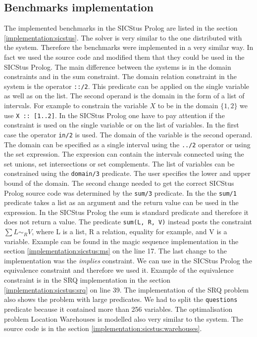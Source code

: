 \subsection{Benchmarks implementation}
The implemented benchmarks in the SICStus Prolog are listed in the section \ref{implementation:sicstus}.
The solver is very similar to the one distributed with the \eclipse system. Therefore
the benchmarks were implemented in a very similar way. In fact we used the \eclipse source
code and modified them that they could be used in the SICStus Prolog. The main difference
between the systems is in the domain constraints and in the sum constraint.
The domain relation constraint in the \eclipse system is the operator \texttt{::/2}.
This predicate can be applied on the single variable as well as on the list.
The second operand is the domain in the form of a list of intervals. For example to constrain
the variable $X$ to be in the domain $\{1,2\}$ we use \texttt{X :: [1..2]}. 
In the SICStus Prolog one have to pay attention if the constraint
is used on the single variable or on the list of variables. In the first case the operator
\texttt{in/2} is used. The domain of the variable is the second operand. The domain 
can be specified as a single interval using the \texttt{../2} operator or using the set
expression. The expresion can contain the intervals connected using the set unions, 
set intersections or set complements. The list of variables can be constrained using
the \texttt{domain/3} predicate. The user specifies the lower and upper bound of the 
domain. The second change needed to get the correct SICStus Prolog source code was
determined by the \texttt{sum/3} predicate. In the \eclipse the \texttt{sum/1} predicate
takes a list as an argument and the return value can be used in the expression. In the SICStus Prolog
the sum is standard predicate and therefore it does not return a value. The predicate 
\texttt{sum(L, R, V)} instead posts the constraint $\sum{L} \sim_R V$, where L is a list,
R a relation, equality for example, and V is a variable. Example can be found in 
the magic sequence implementation in the section \ref{implementation:sicstus:ms} on
the line 17. The last change to the \eclipse implementation was the {\em implies} constraint.
We can use in the SICStus Prolog the equivalence constraint and therefore we used it.
Example of the equivalence constraint is in the SRQ implementation in the section \ref{implementation:sicstus:srq}
on line 39. The implementation of the SRQ problem also shows the problem with large
predicates. We had to split the \texttt{questions} predicate because it contained more than
256 variables. The optimalisation problem Location Warehouses is modelled also very
similar to the \eclipse system. The source code is in the section \ref{implementation:sicstus:warehouses}.
 
